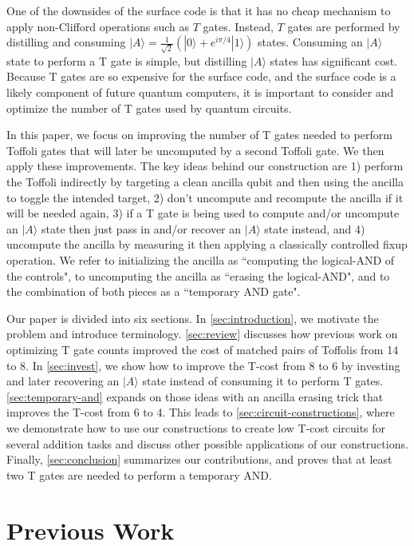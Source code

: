 \documentclass[twocolumn,longbibliography]{quantumarticle-customized}
\begin{document}
One of the downsides of the surface code is that it has no cheap mechanism to apply non-Clifford operations such as $T$ gates.
Instead, $T$ gates are performed by distilling and consuming $|A\rangle = \frac{1}{\sqrt{2}} (|0\rangle + e^{i \pi/4} |1\rangle)$ states.
Consuming an $|A\rangle$ state to perform a T gate is simple, but distilling $|A\rangle$ states has significant cost.
Because T gates are so expensive for the surface code, and the surface code is a likely component of future quantum computers, it is important to consider and optimize the number of T gates used by quantum circuits.

In this paper, we focus on improving the number of T gates needed to perform Toffoli gates that will later be uncomputed by a second Toffoli gate.
We then apply these improvements.
The key ideas behind our construction are 1) perform the Toffoli indirectly by targeting a clean ancilla qubit and then using the ancilla to toggle the intended target, 2) don't uncompute and recompute the ancilla if it will be needed again, 3) if a T gate is being used to compute and/or uncompute an $|A\rangle$ state then just pass in and/or recover an $|A\rangle$ state instead, and 4) uncompute the ancilla by measuring it then applying a classically controlled fixup operation.
We refer to initializing the ancilla as ``computing the logical-AND of the controls", to uncomputing the ancilla as ``erasing the logical-AND", and to the combination of both pieces as a ``temporary AND gate".

Our paper is divided into six sections.
In \autoref{sec:introduction}, we motivate the problem and introduce terminology.
\autoref{sec:review} discusses how previous work on optimizing T gate counts improved the cost of matched pairs of Toffolis from 14 to 8.
In \autoref{sec:invest}, we show how to improve the T-cost from 8 to 6 by investing and later recovering an $|A\rangle$ state instead of consuming it to perform T gates.
\autoref{sec:temporary-and} expands on those ideas with an ancilla erasing trick that improves the T-cost from 6 to 4.
This leads to \autoref{sec:circuit-constructions}, where we demonstrate how to use our constructions to create low T-cost circuits for several addition tasks and discuss other possible applications of our constructions.
Finally, \autoref{sec:conclusion} summarizes our contributions, and proves that at least two T gates are needed to perform a temporary AND.


\section{Previous Work}
\label{sec:review}
\end{document}
